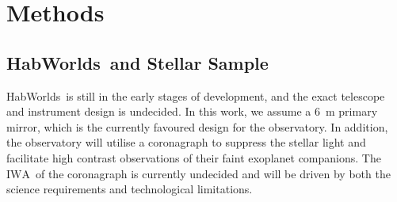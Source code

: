 \documentclass[
    usenatbib,
]{mnras}
\newcommand{\IWA}{\ensuremath{\mathrm{IWA}}}
\newcommand{\hwo}{HabWorlds}
\begin{document}

\section{Methods}


\subsection{\hwo\ and Stellar Sample}
\hwo\ is still in the early stages of development, and the exact telescope and instrument design is undecided. 
%
In this work, we assume a \SI{6}{\meter} primary mirror, which is the currently favoured design for the observatory.
%
In addition, the observatory will utilise a coronagraph to suppress the stellar light and facilitate high contrast observations of their faint exoplanet companions. 
%
The \IWA\ of the coronagraph is currently undecided and will be driven by both the science requirements and technological limitations. 
\end{document}
